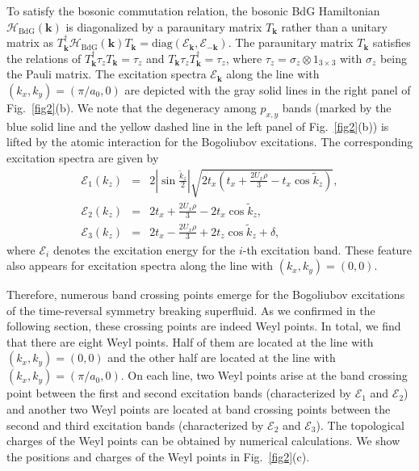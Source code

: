 \documentclass[aps,pra,floatfix,twocolumn,superscriptaddress]{revtex4-1}
\begin{document}
To satisfy the bosonic commutation relation, the bosonic BdG Hamiltonian $\mathcal{H}_{\mathrm{BdG}}(\mathbf{k})$ is diagonalized by a paraunitary matrix $T_\mathbf{k}$ rather than a unitary matrix as $T_\mathbf{k}^\dagger \mathcal{H}_{\mathrm{BdG}}(\mathbf{k}) T_\mathbf{k} = \mathrm{diag} (\mathcal{E}_\mathbf{k}, \mathcal{E}_{-\mathbf{k}})$. The paraunitary matrix $T_\mathbf{k}$ satisfies the relations of $T_\mathbf{k}^\dagger\tau_zT_\mathbf{k}=\tau_z$ and $T_\mathbf{k}\tau_zT_\mathbf{k}^\dagger=\tau_z$, where $\tau_z=\sigma_z \otimes 1_{3\times 3}$ with $\sigma_z$ being the Pauli matrix. The excitation spectra $\mathcal{E}_\mathbf{k}$ along the line with $(k_x,k_y)=(\pi/a_0,0)$ are depicted with the gray solid lines in the right panel of Fig.~\ref{fig2}(b). We note that the degeneracy among $p_{x,y}$ bands (marked by the blue solid line and the yellow dashed line in the left panel of Fig.~\ref{fig2}(b)) is lifted by the atomic interaction for the Bogoliubov excitations. The corresponding excitation spectra are given by
\begin{eqnarray}
	\mathcal{E}_1(k_z)&=&2|\sin\frac{\tilde{k}_{z}}{2}|\sqrt{2t_{x}\left(t_{x}+\frac{2U_{x}\rho}{3}-t_{x}\cos \tilde{k}_{z}\right)},\nonumber\\
	\mathcal{E}_2(k_z)&=&2t_{x}+\frac{2U_{x}\rho}{3}-2t_{x}\cos \tilde{k}_{z},\nonumber\\
  \mathcal{E}_3(k_z)&=&2t_{x}-\frac{2U_{x}\rho}{3}+2t_{z}\cos \tilde{k}_{z}+\delta,
\end{eqnarray}
where $\mathcal{E}_i$ denotes the excitation energy for the $i$-th excitation band. These feature also appears for excitation spectra along the line with $(k_x,k_y)=(0,0)$.

Therefore, numerous band crossing points emerge for the Bogoliubov excitations of the time-reversal symmetry breaking superfluid. As we confirmed in the following section, these crossing points are indeed Weyl points. In total, we find that  there are eight Weyl points. Half of them are located at the line with $(k_x,k_y)=(0,0)$ and the other half are located at the line with $(k_x,k_y)=(\pi/a_0,0)$.  On each line, two Weyl points arise at the band crossing point between the first and second excitation bands (characterized by $\mathcal{E}_1$ and $\mathcal{E}_2$) and another two Weyl points are located at band crossing points between the second and third excitation bands (characterized by $\mathcal{E}_2$ and $\mathcal{E}_3$). The topological charges of the Weyl points can be obtained by numerical calculations. We show the positions and charges of the Weyl points in Fig.~\ref{fig2}(c).
\end{document}
